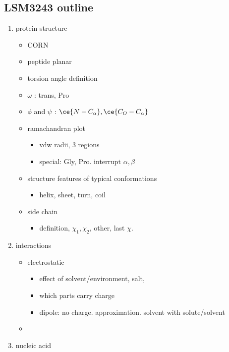 \documentclass[]{article}
\begin{document}
\hypertarget{lsm3243-outline}{%
\subsection{LSM3243 outline}\label{lsm3243-outline}}

\begin{enumerate}
\def\labelenumi{\arabic{enumi}.}
\item
  protein structure

  \begin{itemize}
  \item
    CORN
  \item
    peptide planar
  \item
    torsion angle definition
  \item
    \(\omega\) : trans, Pro
  \item
    \(\phi\) and \(\psi\) : \(\ce{N-C_{\alpha}}, \ce{C_O-C_{\alpha}}\)
  \item
    ramachandran plot

    \begin{itemize}
    \item
      vdw radii, 3 regions
    \item
      special: Gly, Pro. interrupt \(\alpha, \beta\)
    \end{itemize}
  \item
    structure features of typical conformations

    \begin{itemize}
    \item
      helix, sheet, turn, coil
    \end{itemize}
  \item
    side chain

    \begin{itemize}
    \item
      definition, \(\chi_1, \chi_2\), other, last \(\chi\).
    \end{itemize}
  \end{itemize}
\item
  interactions

  \begin{itemize}
  \item
    electrostatic

    \begin{itemize}
    \item
      effect of solvent/environment, salt, 
    \item
      which parts carry charge
    \item
      dipole: no charge. approximation. solvent with solute/solvent
    \end{itemize}
  \item
  \end{itemize}
\item
  nucleic acid


\end{enumerate}
\end{document}

